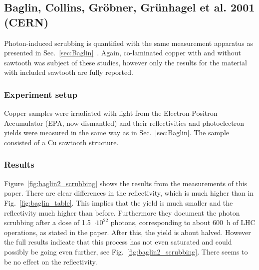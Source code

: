 \subsection{Baglin, Collins, Gröbner, Grünhagel et al. 2001 (CERN)}
\label{sec:Baglin2}
Photon-induced scrubbing is quantified with the same measurement apparatus as presented in Sec.~\ref{sec:Baglin}~\cite{baglin2}.
Again, co-laminated copper with and without sawtooth was subject of these studies, however only the results for the material with included sawtooth are fully reported.

\subsubsection{Experiment setup}
Copper samples were irradiated with light from the Electron-Positron Accumulator (EPA, now dismantled) and their reflectivities and photoelectron yields were measured in the same way as in Sec.~\ref{sec:Baglin}.
The sample consisted of a Cu sawtooth structure.


\subsubsection{Results}

Figure~\ref{fig:baglin2_scrubbing} shows the results from the measurements of this paper.
There are clear differences in the reflectivity, which is much higher than in Fig.~\ref{fig:baglin_table}.
This implies that the yield is much smaller and the reflectivity much higher than before.
Furthermore they document the photon scrubbing after a dose of 1.5~$\cdot10^{22}$ photons, corresponding to about 600~h of LHC operations, as stated in the paper.
After this, the yield is about halved.
However the full results indicate that this process has not even saturated and could possibly be going even further, see Fig.~\ref{fig:baglin2_scrubbing}.
There seems to be no effect on the reflectivity.

